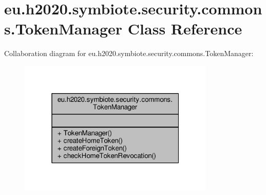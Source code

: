 \hypertarget{classeu_1_1h2020_1_1symbiote_1_1security_1_1commons_1_1TokenManager}{}\section{eu.\+h2020.\+symbiote.\+security.\+commons.\+Token\+Manager Class Reference}
\label{classeu_1_1h2020_1_1symbiote_1_1security_1_1commons_1_1TokenManager}


Collaboration diagram for eu.\+h2020.\+symbiote.\+security.\+commons.\+Token\+Manager\+:
\nopagebreak
\begin{figure}[H]
\begin{center}
\leavevmode
\includegraphics[width=265pt]{classeu_1_1h2020_1_1symbiote_1_1security_1_1commons_1_1TokenManager__coll__graph}
\end{center}
\end{figure}
